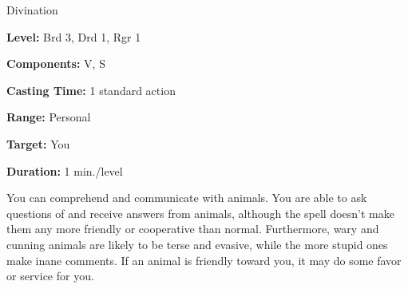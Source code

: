 
Divination

\textbf{Level:} Brd 3, Drd 1, Rgr 1

\textbf{Components:} V, S

\textbf{Casting Time:} 1 standard action

\textbf{Range:} Personal

\textbf{Target:} You

\textbf{Duration:} 1 min./level

You can comprehend and communicate with animals. You are able to ask questions 
of and receive answers from animals, although the spell doesn't make them any more 
friendly or cooperative than normal. Furthermore, wary and cunning animals are 
likely to be terse and evasive, while the more stupid ones make inane comments. 
If an animal is friendly toward you, it may do some favor or service for you.

